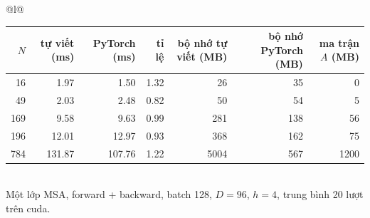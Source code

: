 \begin{tabular}{@{}l@{}}
\begin{tabular}{rrrrrrr}
\toprule
$N$ & tự viết (ms) & PyTorch (ms) & tỉ lệ & bộ nhớ tự viết (MB) & bộ nhớ PyTorch (MB) & ma trận $A$ (MB) \\
\midrule
16 & 1.97 & 1.50 & 1.32 & 26 & 35 & 0 \\
49 & 2.03 & 2.48 & 0.82 & 50 & 54 & 5 \\
169 & 9.58 & 9.63 & 0.99 & 281 & 138 & 56 \\
196 & 12.01 & 12.97 & 0.93 & 368 & 162 & 75 \\
784 & 131.87 & 107.76 & 1.22 & 5004 & 567 & 1200 \\
\bottomrule
\end{tabular}
\\[2pt]
{\footnotesize Một lớp MSA, forward + backward, batch 128, $D=96$, $h=4$, trung bình 20 lượt trên cuda.}
\end{tabular}
